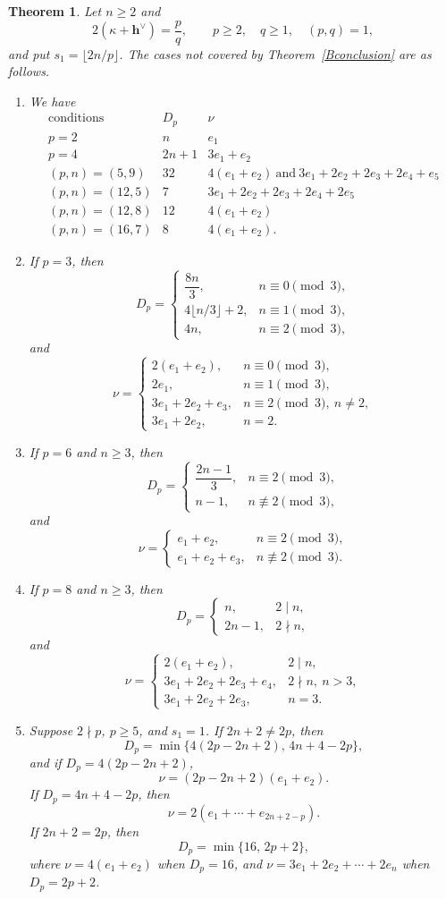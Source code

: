\documentclass[11pt,a4paper]{amsart}
\theoremstyle{plain}
\newtheorem{theorem}{Theorem}[section]
\numberwithin{equation}{section}
\begin{document}
\begin{theorem}\label{specialcaseB}
Let \(n\ge2\) and
\[
2(\kappa+\mathbf{h}^\vee)=\frac pq,\qquad
p\ge2,\quad q\ge1,\quad (p,q)=1,
\]
and put \(s_1=\lfloor2n/p\rfloor\). The cases not covered by
Theorem~\ref{Bconclusion} are as follows. 
\begin{enumerate}
\item We have
\[
\begin{array}{c|c|c}
\text{conditions} & D_p & \nu\\ \hline
p=2 & n & e_1\\[1mm]
p=4 & 2n+1 & 3e_1+e_2\\[1mm]
(p,n)=(5,9) & 32 & 4(e_1+e_2)\ \text{and}\ 3e_1+2e_2+2e_3+2e_4+e_5\\[1mm]
(p,n)=(12,5) & 7 & 3e_1+2e_2+2e_3+2e_4+2e_5\\[1mm]
(p,n)=(12,8) & 12 & 4(e_1+e_2)\\[1mm]
(p,n)=(16,7) & 8 & 4(e_1+e_2).
\end{array}
\]
\item If $p=3$, then
\[
D_p=\begin{cases}
\dfrac{8n}{3},&n\equiv0\pmod3,\\
4\lfloor n/3\rfloor+2,&n\equiv1\pmod3,\\
4n,&n\equiv2\pmod3,
\end{cases}
\]
and
\[
\nu=\begin{cases}
2(e_1+e_2),&n\equiv0\pmod3,\\
2e_1,&n\equiv1\pmod3,\\
3e_1+2e_2+e_3,&n\equiv2\pmod3,\ n\ne2,\\
3e_1+2e_2,&n=2.
\end{cases}
\]
\item If $p=6$ and $n\ge3$, then
\[
D_p=\begin{cases}
\dfrac{2n-1}{3},&n\equiv2\pmod3,\\
n-1,&n\not\equiv2\pmod3,
\end{cases}
\]
and
\[
\nu=\begin{cases}
e_1+e_2,&n\equiv2\pmod3,\\
e_1+e_2+e_3,&n\not\equiv2\pmod3.
\end{cases}
\]
\item If $p=8$ and $n\ge3$, then
\[
D_p=\begin{cases}n,&2\mid n,\\2n-1,&2\nmid n,\end{cases}
\]
and
\[
\nu=\begin{cases}
2(e_1+e_2),&2\mid n,\\
3e_1+2e_2+2e_3+e_4,&2\nmid n,\ n>3,\\
3e_1+2e_2+2e_3,&n=3.
\end{cases}
\]
\item Suppose $2\nmid p$, $p\ge5$, and $s_1=1$. If $2n+2\ne2p$, then
\[
D_p=\min\{4(2p-2n+2),\,4n+4-2p\},
\]
and if \(D_p=4(2p-2n+2)\), 
\[
\nu=(2p-2n+2)(e_1+e_2).\]
If \(D_p=4n+4-2p\), then
\[\nu=2(e_1+\cdots+e_{2n+2-p}).
\]
If $2n+2=2p$, then
\[
D_p=\min\{16,\,2p+2\},
\]
where  \(\nu=4(e_1+e_2)\) when
\(D_p=16\), and \(\nu=3e_1+2e_2+\cdots+2e_n\) when \(D_p=2p+2\).
\end{enumerate}
\end{theorem}
\end{document}
